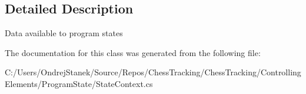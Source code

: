\subsection{Detailed Description}
Data available to program states 



The documentation for this class was generated from the following file\+:\begin{DoxyCompactItemize}
\item 
C\+:/\+Users/\+Ondrej\+Stanek/\+Source/\+Repos/\+Chess\+Tracking/\+Chess\+Tracking/\+Controlling\+Elements/\+Program\+State/State\+Context.\+cs\end{DoxyCompactItemize}
